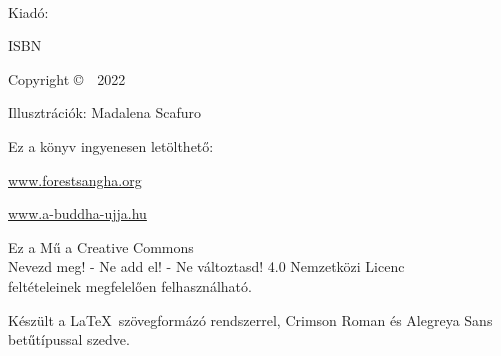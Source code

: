 \cleartoverso
\thispagestyle{empty}

{\copyrightsize
\centering
\setlength{\parindent}{0pt}%
\setlength{\parskip}{0.8\baselineskip}%

\thetitle\\
\theauthor

Kiadó: \thePublisher

ISBN \theISBN

Copyright \copyright\ \theauthor\ 2022

Illusztrációk: Madalena Scafuro

Ez a könyv ingyenesen letölthető:

\href{https://forestsangha.org/}{www.forestsangha.org}

\href{https://a-buddha-ujja.hu/}{www.a-buddha-ujja.hu}

\vfill

\hspace*{-5mm}%
\parbox{\linewidth + 10mm}{%
\centering
Ez a Mű a Creative Commons\\
Nevezd meg! - Ne add el! - Ne változtasd! 4.0 Nemzetközi Licenc\\
feltételeinek megfelelően felhasználható.
}

Készült a \LaTeX\ szövegformázó rendszerrel, Crimson Roman és Alegreya Sans betűtípussal szedve.

\theEditionInfo

}

